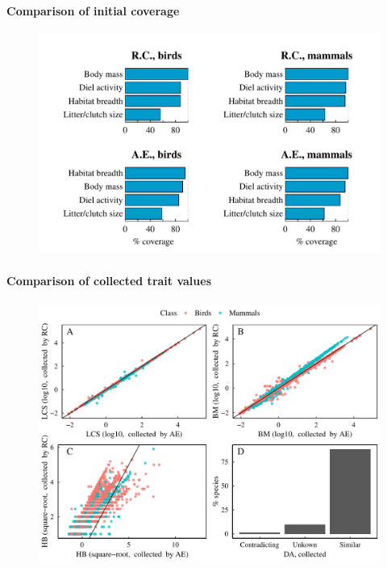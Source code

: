 \paragraph{Comparison of initial coverage}
\begin{figure}[h!]
\centering
\includegraphics[scale=0.7]{figures/chapter2/Comparison_with_RCooke/Coverage.pdf}
\caption[]{}
\label{ComparisonRC_coverage}
\end{figure}

\paragraph{Comparison of collected trait values}
\begin{figure}[h!]
\centering
\includegraphics[scale=0.7]{figures/chapter2/Comparison_with_RCooke/Comparison_collected.pdf}
\caption[]{}
\label{ComparisonRC_collected}
\end{figure}

